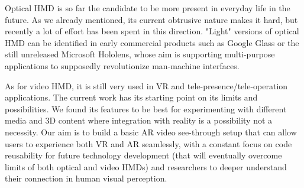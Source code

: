 Optical HMD is so far the candidate to be more present in everyday life in the future. As we already mentioned, its current obtrusive nature makes it hard, but recently a lot of effort has been spent in this direction. "Light" versions of optical HMD can be identified in early commercial products such as Google Glass or the still unreleased Microsoft Hololens, whose aim is supporting multi-purpose applications to supposedly revolutionize man-machine interfaces.

As for video HMD, it is still very used in VR and tele-presence/tele-operation applications. The current work has its starting point on its limits and possibilities. We found its features to be best for experimenting with different media and 3D content where integration with reality is a possibility not a necessity. Our aim is to build a basic AR video see-through setup that can allow users to experience both VR and AR seamlessly, with a constant focus on code reusability for future technology development (that will eventually overcome limits of both optical and video HMDs) and researchers to deeper understand their connection in human visual perception.


